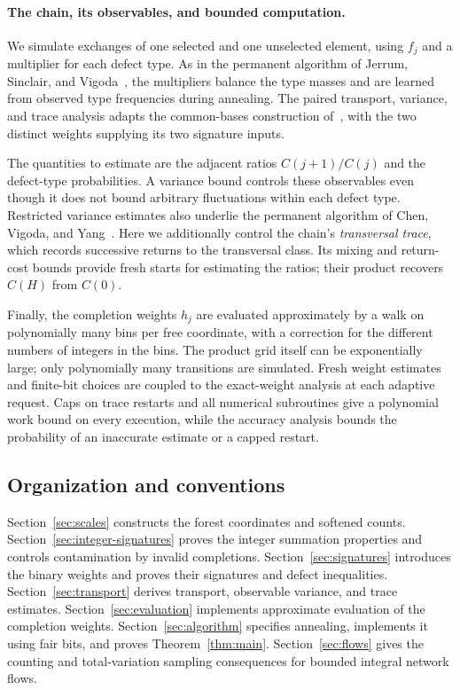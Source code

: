 \paragraph{The chain, its observables, and bounded computation.}
We simulate exchanges of one selected and one unselected element,
using $f_j$ and a multiplier for each defect type. As in the permanent
algorithm of Jerrum, Sinclair, and Vigoda~\cite[Section~3]{JSV2004},
the multipliers balance the type masses and are learned from observed
type frequencies during annealing. The paired transport, variance,
and trace analysis adapts the common-bases construction
of~\cite[Sections~4--6]{OpenAICommonBases2026}, with the two distinct
weights supplying its two signature inputs.

The quantities to estimate are the adjacent ratios $C(j+1)/C(j)$
and the defect-type probabilities. A variance bound controls these
observables even though it does not bound arbitrary fluctuations
within each defect type. Restricted variance estimates also underlie
the permanent algorithm of Chen, Vigoda, and Yang~\cite{CVY2026}.
Here we additionally control the chain's \emph{transversal trace},
which records successive returns to the transversal class. Its mixing
and return-cost bounds provide fresh starts for estimating the ratios;
their product recovers $C(H)$ from $C(0)$.

Finally, the completion weights $h_j$ are evaluated approximately by
a walk on polynomially many bins per free coordinate, with a correction
for the different numbers of integers in the bins. The product grid
itself can be exponentially large; only polynomially many transitions
are simulated. Fresh weight estimates and finite-bit choices are
coupled to the exact-weight analysis at each adaptive request. Caps on
trace restarts and all numerical subroutines give a polynomial work
bound on every execution, while the accuracy analysis bounds the
probability of an inaccurate estimate or a capped restart.

\subsection{Organization and conventions}
Section~\ref{sec:scales} constructs the forest coordinates and softened
counts. Section~\ref{sec:integer-signatures} proves the integer summation
properties and controls contamination by invalid completions.
Section~\ref{sec:signatures} introduces the binary weights and proves
their signatures and defect inequalities. Section~\ref{sec:transport}
derives transport, observable variance, and trace estimates.
Section~\ref{sec:evaluation} implements approximate evaluation of the
completion weights. Section~\ref{sec:algorithm} specifies
annealing, implements it using fair bits, and proves
Theorem~\ref{thm:main}. Section~\ref{sec:flows} gives the counting and
total-variation sampling consequences for bounded integral network flows.

